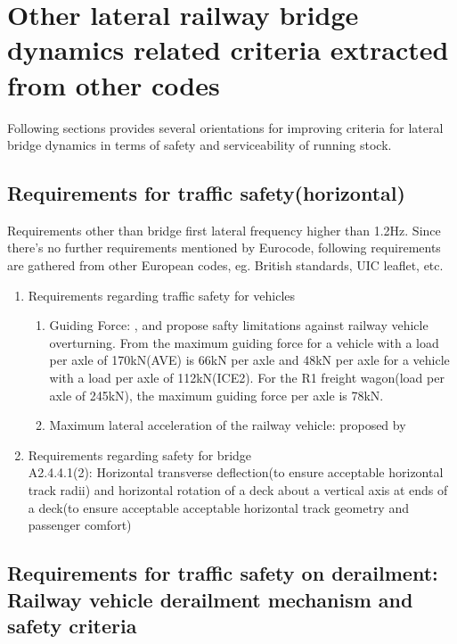 \section{Other lateral railway bridge dynamics related criteria extracted from other codes}
Following sections provides several orientations for improving criteria for lateral bridge dynamics in terms of safety and serviceability of running stock.


\subsection{Requirements for traffic safety(horizontal)}
Requirements other than bridge first lateral frequency higher than 1.2Hz. Since there's no further requirements mentioned by Eurocode, following requirements are gathered from other European codes, eg. British standards, UIC leaflet, etc.

\begin{enumerate}[-]
    \item Requirements regarding traffic safety for vehicles
    \begin{enumerate}
        \item Guiding Force: \citet{code2005518} , \citet{en200714363} and\citet{cuadrado2008analysis} propose safty limitations against railway vehicle overturning. From\citet{en200714363} the maximum guiding force for a vehicle with a load per axle of 170kN(AVE) is 66kN per axle and 48kN per axle for a vehicle with a load per axle of 112kN(ICE2). For the R1 freight wagon(load per axle of 245kN), the maximum guiding force per axle is 78kN.
        \item Maximum lateral acceleration of the railway vehicle: proposed by \citet{13803}
    \end{enumerate}
    \item Requirements regarding safety for bridge\\
    \citet{EC0} A2.4.4.1(2): Horizontal transverse deflection(to ensure acceptable horizontal track radii) and horizontal rotation of a deck about a vertical axis at ends of a deck(to ensure acceptable acceptable horizontal track geometry and passenger comfort)
\end{enumerate}


\subsection{Requirements for traffic safety on derailment: Railway vehicle derailment mechanism and safety criteria}

